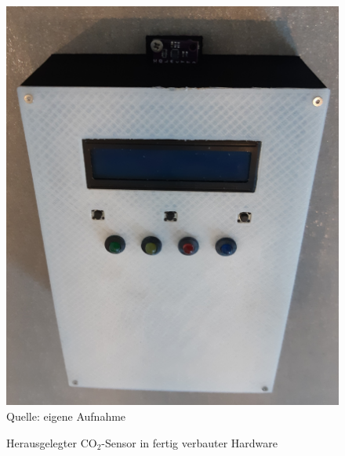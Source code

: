 \begin{figure}
	\centering
	\includegraphics[angle=180,width=0.4\linewidth]{Images/GehaeuseCO2}
	\footnotesize \\Quelle: eigene Aufnahme
	\caption{Herausgelegter CO$_2$-Sensor in fertig verbauter Hardware}
	\label{fig:GehaeuseCO2}
\end{figure}
